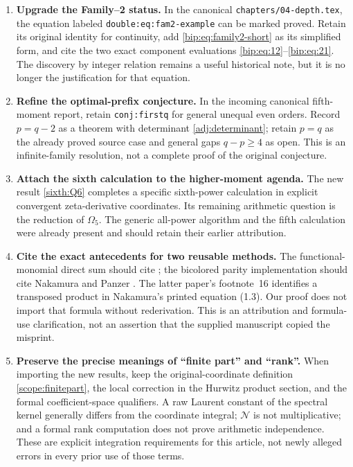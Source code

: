 \documentclass[11pt,a4paper]{article}
\numberwithin{equation}{section}
\theoremstyle{definition}
\theoremstyle{remark}
\newcommand{\NN}{\mathcal N}
\begin{document}
\begin{enumerate}
\item \textbf{Upgrade the Family--2 status.}
In the canonical \texttt{chapters/04-depth.tex}, the equation labeled
\texttt{double:eq:fam2-example} can be marked proved.
Retain its original identity for continuity, add
\eqref{bip:eq:family2-short} as its simplified form, and cite the
two exact component evaluations \eqref{bip:eq:12}--\eqref{bip:eq:21}.
The discovery by integer relation remains a useful historical note,
but it is no longer the justification for that equation.

\item \textbf{Refine the optimal-prefix conjecture.}
In the incoming canonical fifth-moment report, retain
\texttt{conj:firstq} for general unequal even orders.
Record $p=q-2$ as a theorem with determinant
\eqref{adj:determinant}; retain $p=q$ as the already proved source
case and general gaps $q-p\ge4$ as open.
This is an infinite-family resolution, not a complete proof of the
original conjecture.

\item \textbf{Attach the sixth calculation to the higher-moment agenda.}
The new result \eqref{sixth:Q6} completes a specific sixth-power
calculation in explicit convergent zeta-derivative coordinates.
Its remaining arithmetic question is the reduction of $\Omega_5$.
The generic all-power algorithm and the fifth calculation were
already present and should retain their earlier attribution.

\item \textbf{Cite the exact antecedents for two reusable methods.}
The functional-monomial direct sum should cite
\cite[Proposition~4.10]{Guo2014}; the bicolored parity implementation
should cite Nakamura and Panzer \cite{bip:Nakamura2012,bip:Panzer2017}.
The latter paper's footnote~16 identifies a transposed product in
Nakamura's printed equation (1.3).  Our proof does not import that
formula without rederivation.  This is an attribution and formula-use
clarification, not an assertion that the supplied manuscript copied
the misprint.

\item \textbf{Preserve the precise meanings of ``finite part'' and ``rank''.}
When importing the new results, keep the original-coordinate
definition \eqref{scope:finitepart}, the local correction in the
Hurwitz product section, and the formal coefficient-space qualifiers.
A raw Laurent constant of the spectral kernel generally differs
from the coordinate integral; $\NN$ is not multiplicative; and a
formal rank computation does not prove arithmetic independence.
These are explicit integration requirements for this article, not
newly alleged errors in every prior use of those terms.
\end{enumerate}
\end{document}
